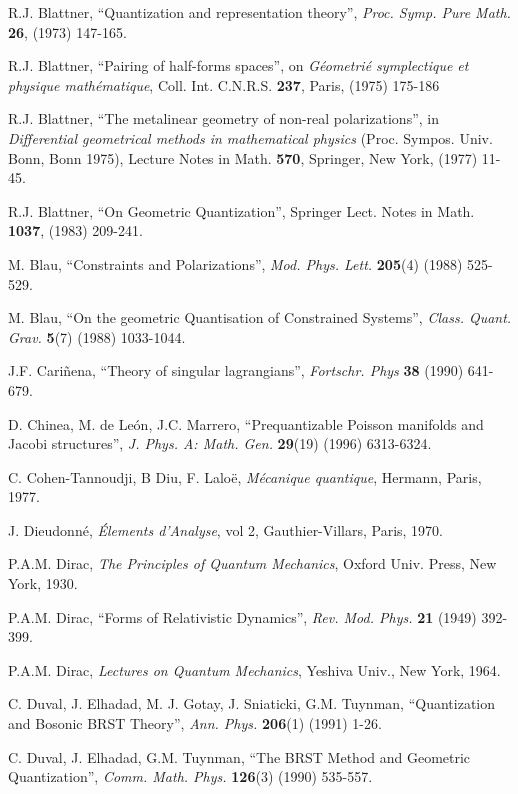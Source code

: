 \documentclass[12pt]{article}
\begin{document}
\begin{thebibliography}{55}
{\sc R.J. Blattner},
``Quantization and representation theory'',
{\it Proc. Symp. Pure Math.} {\bf 26}, (1973) 147-165.

{\sc R.J. Blattner},
``Pairing of half-forms spaces'',
on {\it G\'eometri\'e symplectique et physique math\'ematique},
Coll. Int. C.N.R.S. {\bf 237}, Paris, (1975) 175-186

{\sc R.J. Blattner},
``The metalinear geometry of non-real polarizations'',
in {\it Differential geometrical methods in mathematical physics}
(Proc. Sympos. Univ. Bonn, Bonn 1975),
Lecture Notes in Math. {\bf 570},
Springer, New York, (1977) 11-45.

{\sc R.J. Blattner},
``On Geometric Quantization'',
Springer Lect. Notes in Math.
{\bf 1037}, (1983) 209-241.

{\sc M. Blau},
``Constraints and Polarizations'',
{\it Mod. Phys. Lett.} {\bf 205}(4) (1988) 525-529.

{\sc M. Blau},
``On the geometric Quantisation of Constrained Systems'',
{\it Class. Quant. Grav.} {\bf 5}(7) (1988) 1033-1044.

{\sc J.F. Cari\~nena},
``Theory of singular lagrangians'',
{\it Fortschr. Phys} {\bf 38} (1990) 641-679.

{\sc D. Chinea, M. de Le\'on, J.C. Marrero},
``Prequantizable Poisson manifolds and Jacobi structures'',
{\it J. Phys. A: Math. Gen.} {\bf 29}(19) (1996) 6313-6324.

{\sc C. Cohen-Tannoudji, B Diu, F. Lalo\"e},
{\it M\'ecanique quantique},
Hermann, Paris, 1977.

{\sc J. Dieudonn\'e},
{\it \'Elements d'Analyse},
vol 2, Gauthier-Villars, Paris, 1970.

{\sc P.A.M. Dirac},
{\it The Principles of Quantum Mechanics},
Oxford Univ. Press, New York, 1930.

{\sc P.A.M. Dirac},
``Forms of Relativistic Dynamics'',
{\it Rev. Mod. Phys.} {\bf 21} (1949) 392-399.

{\sc P.A.M. Dirac},
{\it Lectures on Quantum Mechanics},
Yeshiva Univ., New York, 1964.

{\sc C. Duval, J. Elhadad, M. J. Gotay, J. Sniaticki, G.M. Tuynman},
``Quantization and Bosonic BRST Theory'',
{\it Ann. Phys.} {\bf 206}(1) (1991) 1-26.

{\sc C. Duval, J. Elhadad, G.M. Tuynman},
``The BRST Method and Geometric Quantization'',
{\it Comm. Math. Phys.} {\bf 126}(3) (1990) 535-557.


\end{thebibliography}
\end{document}
